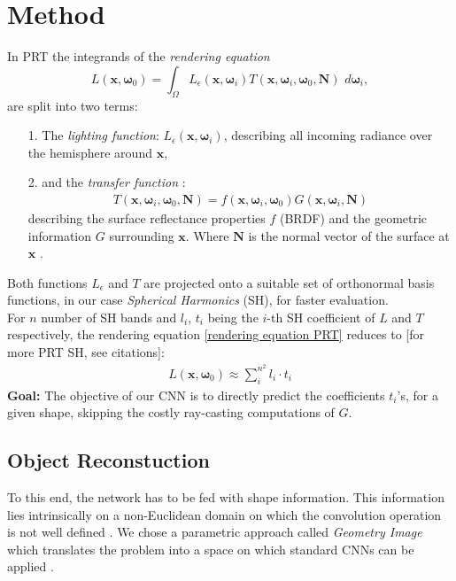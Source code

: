 \section{Method}
In PRT the integrands of the \textit{rendering equation}
\begin{equation}
L(\bm{x}, \bm{\omega}_0 ) = 
\int_{\Omega} L_{\epsilon}(\bm{x}, \bm{\omega}_i ) 
T(\bm{x},\bm{\omega}_i,\bm{\omega}_0, \bm{N}) 
\,  \, d\bm{\omega}_i ,
\label{rendering equation PRT}
\end{equation}
 are split into two terms:
\begin{itemize}
\item[1.] The \textit{lighting function}: $L_{\epsilon}(\bm{x}, \bm{\omega}_i ) $, describing all incoming radiance over the hemisphere around $\bm{x}$,
\item[2.] and the \textit{transfer function} :  
\begin{align*}
T(\bm{x},\bm{\omega}_i,\bm{\omega}_0, \bm{N}) = f(\bm{x},\bm{\omega}_i,\bm{\omega}_0) G(\bm{x},\bm{\omega}_i,\bm{N}) 
\end{align*}
describing the surface reflectance properties $f$ (BRDF) and the geometric information $G$ surrounding $\bm{x}$. 
Where $\bm{N}$ is the normal vector of the surface at $\bm{x}$ .
\end{itemize}
Both functions $L_{\epsilon} $ and $T$ are projected onto a suitable set of orthonormal basis functions, in our case \textit{Spherical Harmonics} (SH), for faster evaluation.\\
For $n$ number of SH bands and $l_i$, $t_i$ being the $i$-th SH coefficient of $L$ and $T$ respectively, the rendering equation \ref{rendering equation PRT} reduces to  [for more PRT SH, see citations]: 
\begin{align*}
L(\bm{x}, \bm{\omega}_0 ) \approx \sum_{i}^{n^2} l_i \cdot t_i
\end{align*}
\textbf{Goal:} The objective of our CNN is to directly predict the coefficients $t_i$'s, for a given shape, skipping the costly ray-casting computations of $G$. 
\subsection{Object Reconstuction}
To this end, the network has to be fed with shape information. This information lies intrinsically on a non-Euclidean domain on which the convolution operation is not well defined \cite{Masci2015ShapeNetCN ,Geometric_deep_learning, CNN_on_Torus}. We chose a parametric approach called \textit{Geometry Image } which translates the problem into a space on which standard CNNs can be applied \cite{gu2002geometry, sinha2016deep}. 

